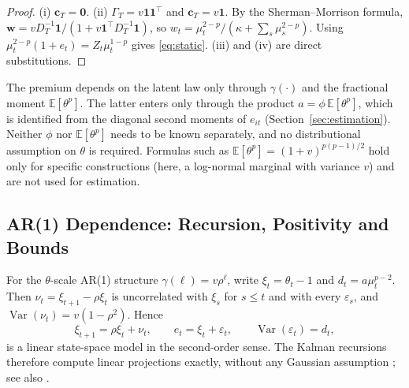 \documentclass[mathematics,article,submit,moreauthors]{Definitions/mdpi}
\DeclareMathOperator{\Var}{Var}
\newcommand{\E}{\mathbb{E}}
\newcommand{\bc}{\boldsymbol{c}}
\newcommand{\bw}{\boldsymbol{w}}
\newcommand{\bone}{\mathbf{1}}
\begin{document}
\begin{proof}
(i) $\bc_T=\boldsymbol0$. (ii) $\Gamma_T=v\bone\bone^\top$ and $\bc_T=v\bone$. By the Sherman--Morrison formula, $\bw=v D_T^{-1}\bone/(1+v\bone^\top D_T^{-1}\bone)$, so $w_t=\mu_t^{2-p}/(\kappa+\sum_s\mu_s^{2-p})$. Using $\mu_t^{2-p}(1+e_t)=Z_t\mu_t^{1-p}$ gives \eqref{eq:static}. (iii) and (iv) are direct substitutions.
\end{proof}

\begin{Remark}\label{rem:moments}
The premium depends on the latent law only through $\gamma(\cdot)$ and the fractional moment $\E[\theta^p]$. The latter enters only through the product $a=\phi\,\E[\theta^p]$, which is identified from the diagonal second moments of $e_{it}$ (Section~\ref{sec:estimation}). Neither $\phi$ nor $\E[\theta^p]$ needs to be known separately, and no distributional assumption on $\theta$ is required. Formulas such as $\E[\theta^p]=(1+v)^{p(p-1)/2}$ hold only for specific constructions (here, a log-normal marginal with variance $v$) and are not used for estimation.
\end{Remark}

\subsection{AR(1) Dependence: Recursion, Positivity and Bounds}

For the $\theta$-scale AR(1) structure $\gamma(\ell)=v\rho^\ell$, write $\xi_t=\theta_t-1$ and $d_t=a\mu_t^{p-2}$. Then $\nu_t=\xi_{t+1}-\rho \xi_t$ is uncorrelated with $\xi_s$ for $s\le t$ and with every $\varepsilon_s$, and $\Var(\nu_t)=v(1-\rho^2)$. Hence
\[
\xi_{t+1}=\rho \xi_t+\nu_t,\qquad e_t=\xi_t+\varepsilon_t,\qquad \Var(\varepsilon_t)=d_t,
\]
is a linear state-space model in the second-order sense. The Kalman recursions therefore compute linear projections exactly, without any Gaussian assumption \citep[Chapter~12]{brockwell1991}; see also \citet{harvey1989}.
\end{document}
